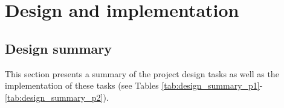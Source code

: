 
\section{Design and implementation} \label{sec:Design and Implementation}


\subsection{Design summary}

This section presents a summary of the project design tasks as well as the implementation of these tasks (see Tables \ref{tab:design_summary_p1}-\ref{tab:design_summary_p2}).

